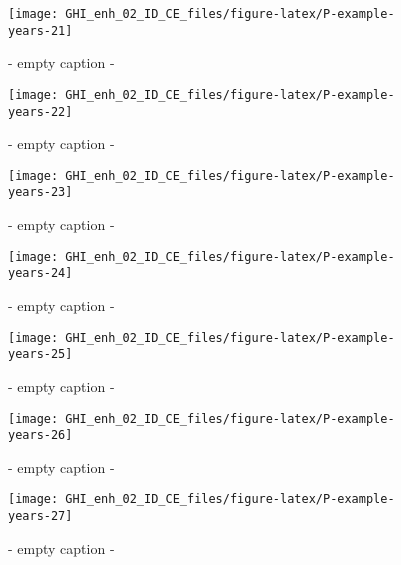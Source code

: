 \documentclass[
  10pt,
  a4paper,oneside]{article}
\begin{document}
\begin{figure}[H]

{\centering \texttt{[image: GHI\_enh\_02\_ID\_CE\_files/figure-latex/P-example-years-21]} 

}

\caption{ - empty caption - }\label{fig:P-example-years-21}
\end{figure}
\begin{figure}[H]

{\centering \texttt{[image: GHI\_enh\_02\_ID\_CE\_files/figure-latex/P-example-years-22]} 

}

\caption{ - empty caption - }\label{fig:P-example-years-22}
\end{figure}
\begin{figure}[H]

{\centering \texttt{[image: GHI\_enh\_02\_ID\_CE\_files/figure-latex/P-example-years-23]} 

}

\caption{ - empty caption - }\label{fig:P-example-years-23}
\end{figure}
\begin{figure}[H]

{\centering \texttt{[image: GHI\_enh\_02\_ID\_CE\_files/figure-latex/P-example-years-24]} 

}

\caption{ - empty caption - }\label{fig:P-example-years-24}
\end{figure}
\begin{figure}[H]

{\centering \texttt{[image: GHI\_enh\_02\_ID\_CE\_files/figure-latex/P-example-years-25]} 

}

\caption{ - empty caption - }\label{fig:P-example-years-25}
\end{figure}
\begin{figure}[H]

{\centering \texttt{[image: GHI\_enh\_02\_ID\_CE\_files/figure-latex/P-example-years-26]} 

}

\caption{ - empty caption - }\label{fig:P-example-years-26}
\end{figure}
\begin{figure}[H]

{\centering \texttt{[image: GHI\_enh\_02\_ID\_CE\_files/figure-latex/P-example-years-27]} 

}

\caption{ - empty caption - }\label{fig:P-example-years-27}
\end{figure}
\end{document}
